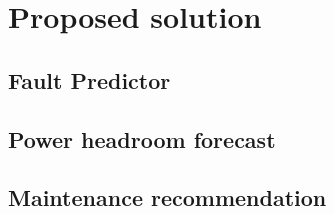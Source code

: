 
\chapter{Proposed solution}
\label{cha:proposed_solution}

\section{Fault Predictor}

\section{Power headroom forecast}

\section{Maintenance recommendation}




